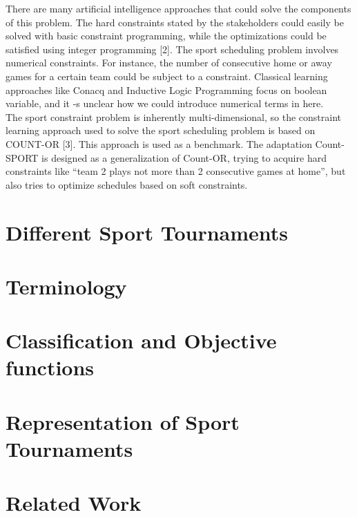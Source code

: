 \documentclass[12pt]{report}
\begin{document}
There are many artificial intelligence approaches that could solve the components of this problem. The hard constraints stated by the stakeholders could easily be solved with basic constraint programming, while the optimizations could be satisfied using integer programming [2]. The sport scheduling problem involves numerical constraints. For instance, the number of consecutive home or away games for a certain team could be subject to a constraint.  Classical learning approaches like Conacq and Inductive Logic Programming focus on boolean variable, and it -s unclear how we could introduce numerical terms in here.
\\[5px]
The sport constraint problem is inherently multi-dimensional, so the constraint learning approach used to solve the sport scheduling problem is based on COUNT-OR [3]. This approach is used as a benchmark. The adaptation Count-SPORT is designed as a generalization of Count-OR, trying to acquire hard constraints like “team 2 plays not more than 2 consecutive games at home”, but also tries to optimize schedules based on soft constraints.



\chapter{Different Sport Tournaments}


\chapter{Terminology}


\chapter{Classification and Objective functions}


\chapter{Representation of Sport Tournaments}


\chapter{Related Work}

\end{document}
